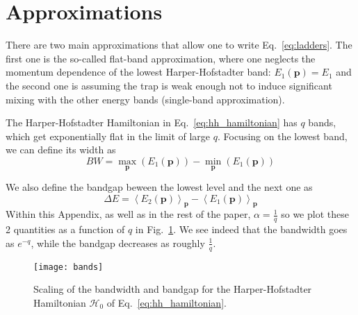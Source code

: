 \documentclass[twocolumn, 10pt, aps, superscriptaddress, floatfix, showpacs, prb, citeautoscript]{revtex4-1}
\newcommand{\vt}[1]{\mathbf{#1}}
\newcommand{\co}[2]{#2}
\renewcommand{\paragraph}{\co}
\begin{document}




\appendix

\section{Approximations}\label{app:approximations}


\paragraph{There are two main approximations in Hannah's paper.}
There are two main approximations that allow one to write
Eq.~\eqref{eq:ladders}. The first one is the so-called flat-band
approximation, where one neglects the momentum dependence of the
lowest Harper-Hofstadter band: $E_1(\vt{p}) = E_1$ and the second one is
assuming the trap is weak enough not to induce significant mixing with
the other energy bands (single-band approximation).

The Harper-Hofstadter Hamiltonian in Eq.~\eqref{eq:hh_hamiltonian} has
$q$ bands, which get exponentially flat in the limit of large
$q$. Focusing on the lowest band, we can define its width as
\begin{equation}
 BW = \max_{\vt{p}}(E_1(\vt{p})) - \min_{\vt{p}}(E_1(\vt{p})) 
\end{equation}

\paragraph{The scaling of bandwidth and bandgap with q is different.}
We also define the bandgap beween the lowest level and the next one as
\begin{equation}
  \Delta E = \left<E_2(\vt{p})\right>_{\vt{p}} - \left<E_1(\vt{p})\right>_{\vt{p}}
\end{equation}
Within this Appendix, as well as in the rest of the paper,
$\alpha=\frac{1}{q}$ so we plot these 2 quantities as a function of
$q$ in Fig.~\ref{fig:energy_bands}. We see indeed that the bandwidth
goes as $e^{-q}$, while the bandgap decreases as roughly
$\frac{1}{q}$.

\begin{figure}[htb]\centering
  \texttt{[image: bands]}
  \caption{Scaling of the bandwidth and bandgap for the
    Harper-Hofstadter Hamiltonian $\mathcal{H}_0$ of
    Eq.~\eqref{eq:hh_hamiltonian}.}
  \label{fig:energy_bands}
\end{figure}
\end{document}

